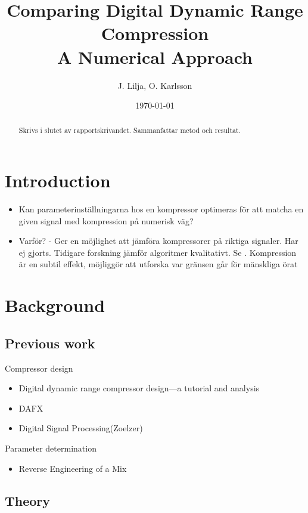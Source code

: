 \documentclass[]{article}
\begin{document}
\title{\Large{Comparing Digital Dynamic Range Compression} \\ \large{A Numerical Approach} }
\author{J. Lilja, O. Karlsson}
\date{\today}
\maketitle

\begin{abstract}
Skrivs i slutet av rapportskrivandet. Sammanfattar metod och resultat.
\end{abstract}

\clearpage

\section{Introduction}
\begin{itemize}
\item{Kan parameterinställningarna hos en kompressor optimeras för att matcha en given signal med kompression på numerisk väg?}
\item{Varför? -  Ger en möjlighet att jämföra kompressorer på riktiga signaler. Har ej gjorts. Tidigare forskning jämför algoritmer kvalitativt. Se \cite{giannoullis}. Kompression är en subtil effekt, möjliggör att utforska var gränsen går för mänskliga örat}
\end{itemize}

\section{Background}

\subsection{Previous work}
Compressor design
\begin{itemize}
\item{Digital dynamic range compressor design—a tutorial and analysis\cite{giannoullis}}
\item{DAFX\cite{dafx}}
\item{Digital Signal Processing(Zoelzer) \cite{zolzer1997digital}}
\end{itemize}
Parameter determination
\begin{itemize}
\item{Reverse Engineering of a Mix \cite{reiss2010rev}}
\end{itemize}

\subsection{Theory}
\end{document}

